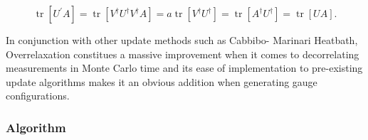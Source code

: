 \documentclass[a4paper,10pt]{article}
\begin{document}
\begin{equation}
\operatorname{tr}\left[U^{\prime} A\right]=\operatorname{tr}\left[V^{\dagger} U^{\dagger} V^{\dagger} A\right]=a \operatorname{tr}\left[V^{\dagger} U^{\dagger}\right]=\operatorname{tr}\left[A^{\dagger} U^{\dagger}\right]=\operatorname{tr}[U A].
\end{equation}

In conjunction with other update methods such as Cabbibo- Marinari Heatbath, Overrelaxation constitues a massive improvement when it comes to decorrelating measurements in Monte Carlo time \cite{PhysRevLett.58.2394} and its ease of implementation to pre-existing update algorithms makes it an obvious addition when generating gauge configurations.

\subsubsection{Algorithm}
\end{document}
